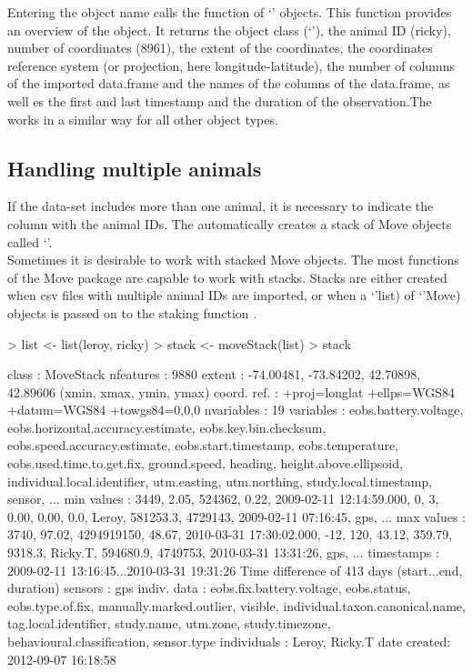 \documentclass[article,nojss]{jss}
\newcommand{\fct}[1]{{\code{#1()}}}
\newcommand{\class}[1]{{`\code{#1}'}}
\begin{document}
Entering the object name calls the \fct{show} function of \class{Move} objects. This function provides an overview of the object. It returns the object class (\class{Move}), the animal ID (ricky), number of coordinates (8961), the extent of the coordinates, the coordinates reference system (or projection, here longitude-latitude), the number of columns of the imported data.frame and the names of the columns of the data.frame, as well es the first and last timestamp and the duration of the observation.The \fct{show} works in a similar way for all other object types.\\


\subsection{Handling multiple animals}
If the data-set includes more than one animal, it is necessary to indicate the column with the animal IDs. The \fct{move} automatically creates a stack of Move objects called \class{MoveStack}. \\
Sometimes it is desirable to work with stacked Move objects. The most functions of the Move package are capable to work with stacks. Stacks are either created when csv files with multiple animal IDs are imported, or when a \class(list) of \class(Move) objects is passed on to the staking function \fct{moveStack}.

\begin{Schunk}
\begin{Sinput}
> list <- list(leroy, ricky)
> stack <- moveStack(list)
> stack
\end{Sinput}
\begin{Soutput}
class       : MoveStack 
nfeatures   : 9880 
extent      : -74.00481, -73.84202, 42.70898, 42.89606  (xmin, xmax, ymin, ymax)
coord. ref. : +proj=longlat +ellps=WGS84 +datum=WGS84 +towgs84=0,0,0 
nvariables  : 19
variables   : eobs.battery.voltage, eobs.horizontal.accuracy.estimate, eobs.key.bin.checksum, eobs.speed.accuracy.estimate, eobs.start.timestamp, eobs.temperature, eobs.used.time.to.get.fix, ground.speed, heading, height.above.ellipsoid, individual.local.identifier, utm.easting, utm.northing, study.local.timestamp, sensor, ... 
min values  : 3449,  2.05,     524362,  0.22, 2009-02-11 12:14:59.000,   0,   3,  0.00,   0.00,    0.0, Leroy, 581253.3, 4729143, 2009-02-11 07:16:45, gps, ... 
max values  : 3740, 97.02, 4294919150, 48.67, 2010-03-31 17:30:02.000, -12, 120, 43.12, 359.79, 9318.3, Ricky.T, 594680.9, 4749753, 2010-03-31 13:31:26, gps, ... 
timestamps  : 2009-02-11 13:16:45...2010-03-31 19:31:26 Time difference of 413 days  (start...end, duration) 
sensors     : gps 
indiv. data : eobs.fix.battery.voltage, eobs.status, eobs.type.of.fix, manually.marked.outlier, visible, individual.taxon.canonical.name, tag.local.identifier, study.name, utm.zone, study.timezone, behavioural.classification, sensor.type 
individuals : Leroy, Ricky.T 
date created: 2012-09-07 16:18:58 
\end{Soutput}
\end{Schunk}
\end{document}
